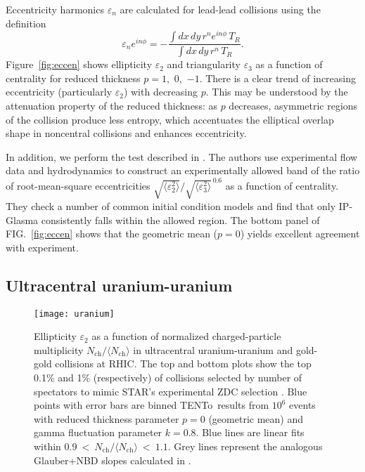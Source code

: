 \documentclass[aps,prl,reprint,amsmath,nofootinbib]{revtex4-1}
\newcommand{\trento}{T\raisebox{-.5ex}{R}ENTo}
\newcommand{\nch}{N_\text{ch}}
\newcommand{\eccratio}{\sqrt{\langle \varepsilon_2^2 \rangle}/\sqrt{\langle \varepsilon_3^2 \rangle}^{\,0.6}}
\begin{document}
Eccentricity harmonics $\varepsilon_n$ are calculated for lead-lead collisions using the definition
\begin{equation}
  \varepsilon_n e^{i n\phi} = -\frac{\int dx \, dy\, r^n e^{i n \phi} \, T_R}{\int dx \, dy \, r^n \, T_R}.
\end{equation}
Figure~\ref{fig:eccen} shows ellipticity $\varepsilon_2$ and triangularity $\varepsilon_3$ as a function of
centrality for reduced thickness $p = 1$,~0,~$-1$.  There is a clear trend of increasing eccentricity
(particularly $\varepsilon_2$) with decreasing $p$.  This may be understood by the attenuation property of the
reduced thickness:  as $p$ decreases, asymmetric regions of the collision produce less entropy, which
accentuates the elliptical overlap shape in noncentral collisions and enhances eccentricity.

In addition, we perform the test described in \cite{constraining-ic}.  The authors use experimental flow data
and hydrodynamics to construct an experimentally allowed band of the ratio of root-mean-square eccentricities
$\eccratio$ as a function of centrality.  They check a number of common initial condition models and find that
only IP-Glasma consistently falls within the allowed region.  The bottom panel of FIG.~\ref{fig:eccen} shows
that the geometric mean ($p = 0$) yields excellent agreement with experiment.

\subsection{Ultracentral uranium-uranium}

\begin{figure}[t]
  \centering
  \texttt{[image: uranium]}
  \caption{
    \label{fig:uranium}
    Ellipticity $\varepsilon_2$ as a function of normalized charged-particle multiplicity
    $\nch/\langle\nch\rangle$ in ultracentral uranium-uranium and gold-gold collisions at RHIC.  The top and
    bottom plots show the top 0.1\% and 1\% (respectively) of collisions selected by number of spectators to
    mimic STAR's experimental ZDC selection \cite{UU-STAR}.  Blue points with error bars are binned
    \protect\trento\ results from $10^6$ events with reduced thickness parameter $p = 0$ (geometric mean) and
    gamma fluctuation parameter $k = 0.8$.  Blue lines are linear fits within
    $0.9~<~\nch/\langle\nch\rangle~<~1.1$.  Grey lines represent the analogous Glauber+NBD slopes calculated
    in \cite{UU-STAR}.
  }
\end{figure}
\end{document}
